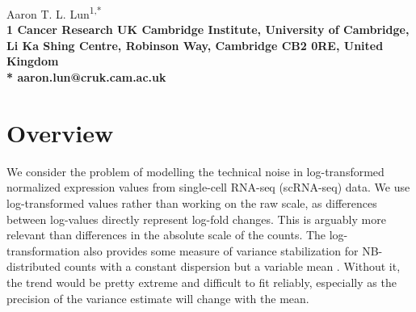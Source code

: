 \documentclass{article}
\begin{document}
\vspace*{0.35in}

\begin{flushleft}
{\Large
\textbf{}
}
\newline

Aaron T. L. Lun\textsuperscript{1,*}
\\
\bigskip
\bf{1} Cancer Research UK Cambridge Institute, University of Cambridge, Li Ka Shing Centre, Robinson Way, Cambridge CB2 0RE, United Kingdom
\\
\bigskip
* aaron.lun@cruk.cam.ac.uk

\end{flushleft}

\section{Overview}
We consider the problem of modelling the technical noise in log-transformed normalized expression values from single-cell RNA-seq (scRNA-seq) data.
We use log-transformed values rather than working on the raw scale, as differences between log-values directly represent log-fold changes.
This is arguably more relevant than differences in the absolute scale of the counts.
The log-transformation also provides some measure of variance stabilization for NB-distributed counts with a constant dispersion but a variable mean \citep{law2014voom}. 
Without it, the trend would be pretty extreme and difficult to fit reliably, especially as the precision of the variance estimate will change with the mean.

\end{document}
